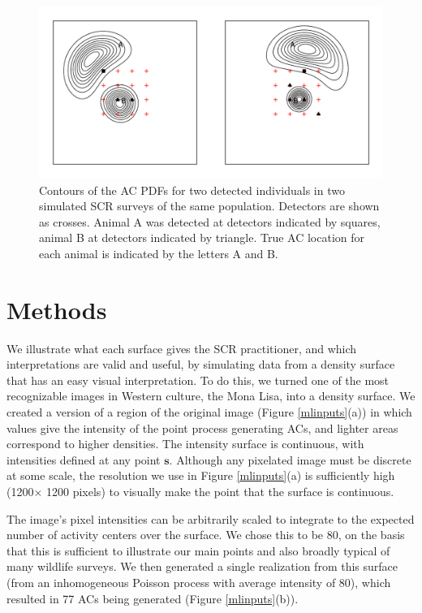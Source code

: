 \documentclass[useAMS,usenatbib,referee]{biom}
\begin{document}
\begin{figure}[htbp]
\centering
\includegraphics[width=\textwidth]{screrr.pdf}
\caption{Contours of the AC PDFs for two detected individuals in two simulated SCR surveys of the same population. Detectors are shown as crosses. Animal A was detected at detectors indicated by squares, animal B at detectors indicated by triangle. True AC location for each animal is indicated by the letters A and B.}
\label{fig:screrr}
\end{figure}

\section{Methods}

We illustrate what each surface gives the SCR practitioner, and which interpretations are valid and useful, by simulating data from a density surface that has an easy visual interpretation. To do this, we turned one of the most recognizable images in Western culture, the Mona Lisa, into a density surface. We created a version of a region of the original image (Figure \ref{mlinputs}(a)) in which values give the intensity of the point process generating ACs, and lighter areas correspond to higher densities. The intensity surface is continuous, with intensities defined at any point $\bm{s}$. Although any pixelated image must be discrete at some scale, the resolution we use in Figure \ref{mlinputs}(a) is sufficiently high (1200$\times$ 1200 pixels) to visually make the point that the surface is continuous.  

The image's pixel intensities can be arbitrarily scaled to integrate to the expected number of activity centers over the surface. We chose this to be 80, on the basis that this is sufficient to illustrate our main points and also broadly typical of many wildlife surveys. We then generated a single realization from this surface (from an inhomogeneous Poisson process with average intensity of 80), which resulted in 77 ACs being generated (Figure \ref{mlinputs}(b)).
\end{document}
